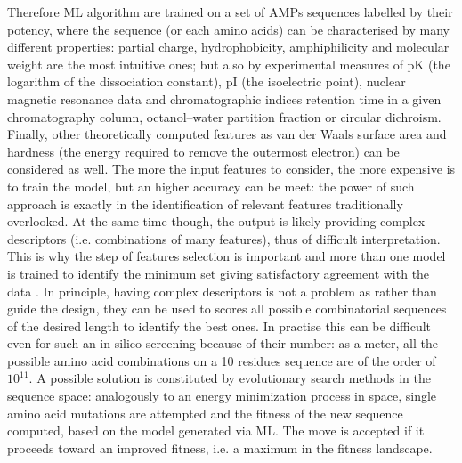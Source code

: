 Therefore ML algorithm are trained on a set of AMPs sequences labelled by their potency, where the sequence (or each amino acids) can be characterised by many different properties: partial charge, hydrophobicity, amphiphilicity and molecular weight are the most intuitive ones; but also by experimental measures of pK (the logarithm of the dissociation constant), pI (the isoelectric point), nuclear magnetic resonance data and chromatographic indices retention time in a given chromatography column, octanol–water partition fraction or circular dichroism. Finally, other theoretically computed features as van der Waals surface area and hardness (the energy required to remove the outermost electron) can be considered as well.
%
The more the input features to consider, the more expensive is to train the model, but an higher accuracy can be meet: the power of such approach is exactly in the identification of relevant features traditionally overlooked. At the same time though, the output is likely providing complex descriptors (i.e. combinations of many features), thus of difficult interpretation. This is why the step of features selection is important and more than one model is trained to identify the minimum set giving satisfactory agreement with the data \cite{Walters2005,Gonzalez2008}.
%
In principle, having complex descriptors is not a problem as rather than guide the design, they can be used to scores all possible combinatorial sequences of the desired length to identify the best ones. In practise this can be difficult even for such an in silico screening because of their number: as a meter, all the possible amino acid combinations on a 10 residues sequence are of the order of $10^{11}$.
%
A possible solution is constituted by evolutionary search methods in the sequence space: analogously to an energy minimization process in space, single amino acid mutations are attempted and the fitness of the new sequence computed, based on the model generated via ML. The move is accepted if it proceeds toward an improved fitness, i.e. a maximum in the fitness landscape.

